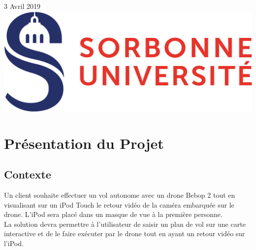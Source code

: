 \documentclass{article}
\begin{document}
\begin{titlepage}

{\large 3 Avril 2019}\\[3cm] %


\includegraphics[scale=0.15]{logo_sorbonne.png} %
 

\vfill %

\end{titlepage}

\newpage
\renewcommand{\contentsname}{\center{Table des Matières}\vspace*{5cm}}

\tableofcontents



\newpage
\section{Présentation du Projet}
	\subsection{Contexte}
		Un client souhaite effectuer un vol autonome avec un drone Bebop 2 tout en visualisant sur un iPod Touch le retour vidéo de la caméra embarquée sur le drone. L'iPod sera placé dans un masque de vue à la première personne. \\	
		La solution devra permettre à l'utilisateur de saisir un plan de vol sur une carte interactive et de le faire exécuter par le drone tout en ayant un retour vidéo sur l'iPod.\\
		
\end{document}
